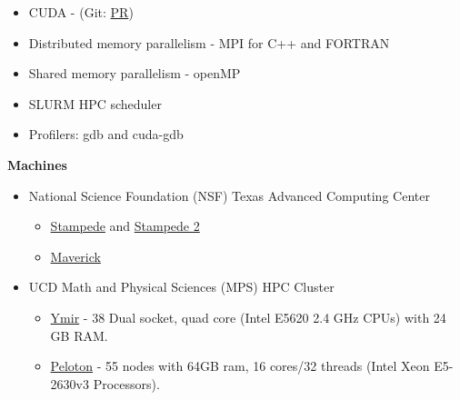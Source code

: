 \documentclass[11pt]{ltxdoc}
\begin{document}
\begin{description}
\begin{description}
\begin{itemize}
          \item CUDA - (Git: \href{https://github.com/geodynamics/calypso/pull/3}{PR})
                   
          \item Distributed memory parallelism - MPI for C++ and FORTRAN
      
          \item Shared memory parallelism - openMP
          
          \item SLURM HPC scheduler
          
          \item Profilers: gdb and cuda-gdb
      
      \end{itemize}
      
    \item[] \textbf{Machines}
    
      \vskip 06pt 
      
      \begin{itemize}
        
        \item National Science Foundation (NSF) Texas Advanced Computing Center
      
      \begin{itemize}
      	
        \item \href{https://portal.xsede.org/tacc-stampede}{Stampede} and \href{https://portal.xsede.org/tacc-stampede2}{Stampede 2}
        
        \item \href{https://portal.xsede.org/tacc-maverick}{Maverick} 
        
      \end{itemize}
  
      \item UCD Math and Physical Sciences (MPS) HPC Cluster
      
        \begin{itemize}
      	
          \item \href{https://wiki.cse.ucdavis.edu/support/systems/ymir}{Ymir} - 38 Dual socket, quad core (Intel E5620 2.4 GHz CPUs) with 24 GB RAM.
        
          \item \href{https://wiki.cse.ucdavis.edu/support/systems/peloton}{Peloton} - 55 nodes with 64GB ram, 16 cores/32 threads (Intel Xeon E5-2630v3 Processors).
        

\end{itemize}
\end{itemize}
\end{description}
\end{description}
\end{document}
